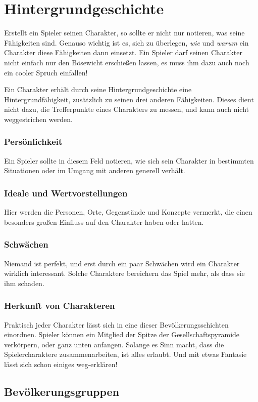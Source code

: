 \section{Hintergrundgeschichte}
Erstellt ein Spieler seinen Charakter, so sollte er nicht nur notieren, was seine Fähigkeiten sind. Genauso wichtig ist es, sich zu überlegen, \emph{wie} und \emph{warum} ein Charakter diese Fähigkeiten dann einsetzt. Ein Spieler darf seinen Charakter nicht einfach nur den Bösewicht erschießen lassen, es muss ihm dazu auch noch ein cooler Spruch einfallen!

Ein Charakter erhält durch seine Hintergrundgeschichte eine Hintergrundfähigkeit, zusätzlich zu seinen drei anderen Fähigkeiten. Dieses dient nicht dazu, die Trefferpunkte eines Charakters zu messen, und kann auch nicht weggestrichen werden.
\subsubsection{Persönlichkeit}
Ein Spieler sollte in diesem Feld notieren, wie sich sein Charakter in bestimmten Situationen oder im Umgang mit anderen generell verhält.
\subsubsection{Ideale und Wertvorstellungen}
Hier werden die Personen, Orte, Gegenstände und Konzepte vermerkt, die einen besonders großen Einfluss auf den Charakter haben oder hatten.
\subsubsection{Schwächen}
Niemand ist perfekt, und erst durch ein paar Schwächen wird ein Charakter wirklich interessant. Solche Charaktere bereichern das Spiel mehr, als dass sie ihm schaden.
\subsubsection{Herkunft von Charakteren}
Praktisch jeder Charakter lässt sich in eine dieser \glqq Bevölkerungsschichten\grqq{} einordnen. Spieler können ein Mitglied der Spitze der Gesellschaftspyramide verkörpern, oder ganz unten anfangen. Solange es Sinn macht, dass die Spielercharaktere zusammenarbeiten, ist alles erlaubt. Und mit etwas Fantasie lässt sich schon einiges weg-erklären!

\subsection{Bevölkerungsgruppen}

